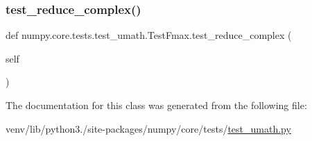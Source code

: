 \subsubsection{\texorpdfstring{test\+\_\+reduce\+\_\+complex()}{test\_reduce\_complex()}}
{\footnotesize\ttfamily def numpy.\+core.\+tests.\+test\+\_\+umath.\+Test\+Fmax.\+test\+\_\+reduce\+\_\+complex (\begin{DoxyParamCaption}\item[{}]{self }\end{DoxyParamCaption})}



The documentation for this class was generated from the following file\+:\begin{DoxyCompactItemize}
\item 
venv/lib/python3./site-\/packages/numpy/core/tests/\hyperlink{test__umath_8py}{test\+\_\+umath.\+py}\end{DoxyCompactItemize}

